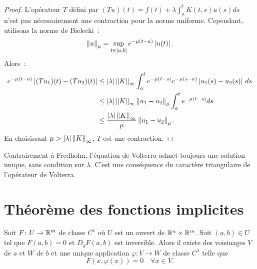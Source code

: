 \begin{proof}
L'op\'erateur $T$ d\'efini par $(Tu)(t) = f(t) + \lambda \int_a^t K(t,s) u(s) ds$ n'est
pas n\'ecessairement une contraction pour la norme uniforme. Cependant, utilisons la norme
de Bielecki~:
\[
  \left\| u \right\|_\mu = \sup_{t \in [a,b]} e^{-\mu(t-a)} \left| u(t) \right|.
\]
Alors~:
\begin{align*}
  e^{-\mu(t-a)} \left| (Tu_1)(t) - (Tu_2)(t) \right|
  &\leq \left| \lambda \right| \left\| K \right\|_\infty \int_a^t e^{-\mu(t-s)} e^{-\mu(s-a)} \left| u_1(s) - u_2(s) \right| \, ds \\
  &\leq \left| \lambda \right| \left\| K \right\|_\infty \left\| u_1 - u_2 \right\|_\mu \int_a^t e^{-\mu(t-s)} ds \\
  &\leq \frac{\left| \lambda \right| \left\| K \right\|_\infty}{\mu} \left\| u_1 - u_2 \right\|_\mu.
\end{align*}
En choisissant $\mu > \left| \lambda \right| \left\| K \right\|_\infty$, $T$ est une contraction.
\end{proof}

\begin{attention}
Contrairement \`a Fredholm, l'\'equation de Volterra admet toujours une solution unique,
sans condition sur $\lambda$. C'est une cons\'equence du caract\`ere \og{}triangulaire\fg
de l'op\'erateur de Volterra.
\end{attention}

\section{Th\'eor\`eme des fonctions implicites}

\begin{theoreme}
\label{thm:implicit}
Soit $F\colon U \to \mathbb{R}^m$ de classe $C^1$ o\`u $U$ est un ouvert de $\mathbb{R}^n \times \mathbb{R}^m$.
Soit $(a, b) \in U$ tel que $F(a, b) = 0$ et $D_y F(a, b)$ est inversible. Alors il
existe des voisinages $V$ de $a$ et $W$ de $b$ et une unique application
$\varphi\colon V \to W$ de classe $C^1$ telle que
\[
  F(x, \varphi(x)) = 0 \quad \forall x \in V.
\]
\end{theoreme}

